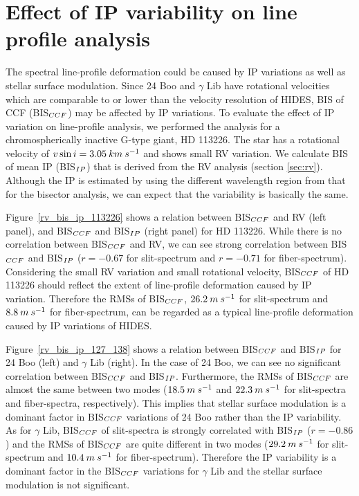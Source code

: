 \documentclass[]{pasj01}
\begin{document}
\appendix
\section*{Effect of IP variability on line profile analysis} \label{appendix}
The spectral line-profile deformation could be caused by IP variations as well as stellar surface modulation.
Since 24 Boo and $\gamma$ Lib have rotational velocities which are comparable to or lower than the velocity resolution of HIDES, BIS of CCF (BIS$_{\rm CCF}$) may be affected by IP variations.
To evaluate the effect of IP variation on line-profile analysis, we performed the analysis for a chromospherically inactive G-type giant, HD 113226.
The star has a rotational velocity of $v\sin{i}=3.05\>{\rm km\>s^{-1}}$ \citep{Takeda2008} and shows small RV variation.
We calculate BIS of mean IP (BIS$_{\rm IP}$) that is derived from the RV analysis (section \ref{sec:rv}). 
Although the IP is estimated by using the different wavelength region from that for the bisector analysis, we can expect that the variability is basically the same.

Figure~\ref{rv_bis_ip_113226} shows a relation between BIS$_{\rm CCF}$ and RV (left panel), and BIS$_{\rm CCF}$ and BIS$_{\rm IP}$ (right panel) for HD 113226.
While there is no correlation between BIS$_{\rm CCF}$ and RV, we can see strong correlation between BIS$_{\rm CCF}$ and BIS$_{\rm IP}$ ($r=-0.67$ for slit-spectrum and $r=-0.71$ for fiber-spectrum).
Considering the small RV variation and small rotational velocity, BIS$_{\rm CCF}$ of HD 113226 should reflect the extent of line-profile deformation caused by IP variation.
Therefore the RMSs of BIS$_{\rm CCF}$, $26.2\>{\rm m\>s^{-1}}$ for slit-spectrum and $8.8\>{\rm m\>s^{-1}}$ for fiber-spectrum, can be regarded as a typical line-profile deformation caused by IP variations of HIDES.

Figure~\ref{rv_bis_ip_127_138} shows a relation between BIS$_{\rm CCF}$ and BIS$_{\rm IP}$ for 24 Boo (left) and $\gamma$ Lib (right).
In the case of 24 Boo, we can see no significant correlation between BIS$_{\rm CCF}$ and BIS$_{\rm IP}$.
Furthermore, the RMSs of BIS$_{\rm CCF}$ are almost the same between two modes ($18.5\>{\rm m\>s^{-1}}$ and $22.3\>{\rm m\>s^{-1}}$ for slit-spectra and fiber-spectra, respectively).
This implies that stellar surface modulation is a dominant factor in BIS$_{\rm CCF}$ variations of 24 Boo rather than the IP variability.
As for $\gamma$ Lib, BIS$_{\rm CCF}$ of slit-spectra is strongly correlated with BIS$_{\rm IP}$ ($r=-0.86$) and the RMSs of BIS$_{\rm CCF}$ are quite different in two modes ($29.2\>{\rm m\>s^{-1}}$ for slit-spectrum and $10.4\>{\rm m\>s^{-1}}$ for fiber-spectrum).
Therefore the IP variability is a dominant factor in the BIS$_{\rm CCF}$ variations for $\gamma$ Lib and the stellar surface modulation is not significant.
\end{document}
